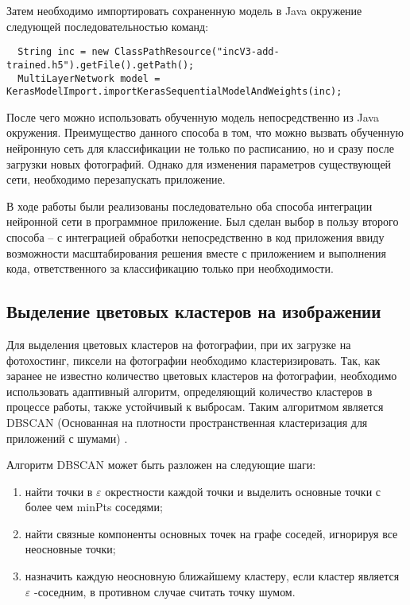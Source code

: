 Затем необходимо импортировать сохраненную модель в Java окружение следующей последовательностью команд:
\begin{lstlisting}
  String inc = new ClassPathResource("incV3-add-trained.h5").getFile().getPath();
  MultiLayerNetwork model = KerasModelImport.importKerasSequentialModelAndWeights(inc);
\end{lstlisting}

После чего можно использовать обученную модель непосредственно из Java окружения. 
Преимущество данного способа в том, что можно вызвать обученную нейронную сеть для классификации не только по расписанию, но и сразу после загрузки новых фотографий. 
Однако для изменения параметров существующей сети, необходимо перезапускать приложение.


В ходе работы были реализованы последовательно оба способа интеграции нейронной сети в программное приложение. 
Был сделан выбор в пользу второго способа – с интеграцией обработки непосредственно в код приложения ввиду возможности масштабирования решения вместе с приложением и выполнения кода,  ответственного за классификацию только при необходимости.

\subsection{Выделение цветовых кластеров на изображении}

Для выделения цветовых кластеров на фотографии, при их загрузке на фотохостинг, пиксели на фотографии необходимо кластеризировать.
Так, как заранее не известно количество цветовых кластеров на фотографии, необходимо использовать адаптивный алгоритм, определяющий количество кластеров в процессе работы, также устойчивый к выбросам.
Таким алгоритмом является DBSCAN (Основанная на плотности пространственная кластеризация для приложений с шумами) \cite{dbscan-alg}.

Алгоритм DBSCAN может быть разложен на следующие шаги:
\begin{enumerate}
    \item найти точки в \(\mathcal{\varepsilon}\) окрестности каждой точки и выделить основные точки с более чем minPts соседями;
    \item найти связные компоненты основных точек на графе соседей, игнорируя все неосновные точки;
    \item назначить каждую неосновную ближайшему кластеру, если кластер является \(\mathcal{\varepsilon}\) -соседним, в противном случае считать точку шумом.
\end{enumerate}

